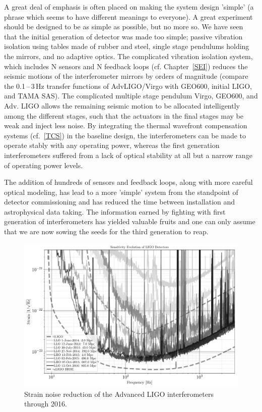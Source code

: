 A great deal of emphasis is often placed on making the system design 'simple'
(a phrase which seems to have different meanings to everyone). A great
experiment should be designed to be as simple as possible, but no more so. We have
seen that the initial generation of detector was made too simple; passive vibration
isolation using tables made of rubber and steel, single stage pendulums holding
the mirrors, and no adaptive optics. The complicated vibration isolation system,
which includes N sensors and N feedback loops (cf. Chapter~\ref{SEI})
reduces the seismic motions of the interferometer mirrors by
orders of magnitude (compare the 0.1\,--\,3\,Hz transfer functions of AdvLIGO/Virgo with GEO600, initial LIGO, and TAMA SAS). The
complicated multiple stage pendulum Virgo, GEO600, and Adv. LIGO
allows the remaining seismic motion to be allocated intelligently
among the different stages, such that the actuators in the final stages
may be weak and inject less noise. By integrating the thermal wavefront
compensation systems (cf.~\ref{TCS}) in the baseline design, the
interferometers can be made to operate stably with any operating power,
whereas the first generation interferometers suffered from a lack of optical stability at all but a narrow range of operating power levels.

The addition of hundreds of sensors and feedback loops, along with more careful
optical modeling, has lead to a more 'simple' system from the standpoint of
detector commissioning and has reduced the time between installation and astrophysical data taking. The information earned by fighting with first generation of interferometers has yielded valuable fruits and one can only assume that we are now sowing the seeds for the third generation to reap.

\begin{figure}[h]
\centering
\includegraphics[width=\columnwidth]{Figures/aLIGO_noises.pdf}
\caption{Strain noise reduction of the Advanced LIGO interferometers
  through 2016.}
\label{fig:IDC:aLIGOnoises}
\end{figure}

